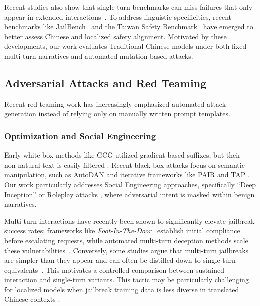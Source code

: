 ﻿\documentclass[conference]{IEEEtran}
\renewcommand{\textbf}[1]{#1}
\begin{document}
Recent studies also show that single-turn benchmarks can miss failures that only appear in extended interactions~\cite{xiao2026m2de}. To address linguistic specificities, recent benchmarks like JailBench~\cite{liu2025jailbenchcomprehensivechinesesecurity} and the Taiwan Safety Benchmark~\cite{hsu2026taiwansafetybenchmarkbreeze} have emerged to better assess Chinese and localized safety alignment. Motivated by these developments, our work evaluates Traditional Chinese models under both fixed multi-turn narratives and automated mutation-based attacks.

\subsection{Adversarial Attacks and Red Teaming}
Recent red-teaming work has increasingly emphasized automated attack generation instead of relying only on manually written prompt templates.

\subsubsection{Optimization and Social Engineering}
Early white-box methods like \textbf{GCG} \cite{zou2023universal} utilized gradient-based suffixes, but their non-natural text is easily filtered \cite{shao2026promptfuzz}. Recent black-box attacks focus on semantic manipulation, such as \textbf{AutoDAN} \cite{liu2023autodan} and iterative frameworks like \textbf{PAIR} \cite{chao2023jailbreaking} and \textbf{TAP} \cite{mehrotra2024tap}. Our work particularly addresses \textbf{Social Engineering approaches}, specifically ``Deep Inception'' or Roleplay attacks \cite{li2023deepinception}, where adversarial intent is masked within benign narratives. 

Multi-turn interactions have recently been shown to significantly elevate jailbreak success rates; frameworks like \textit{Foot-In-The-Door}~\cite{weng2025footinthedoormultiturnjailbreakllms} establish initial compliance before escalating requests, while automated multi-turn deception methods scale these vulnerabilities~\cite{kumarappan2026automatingdeceptionscalablemultiturn}. Conversely, some studies argue that multi-turn jailbreaks are simpler than they appear and can often be distilled down to single-turn equivalents~\cite{yang2025multiturnjailbreakssimpler}. This motivates a controlled comparison between sustained interaction and single-turn variants. This tactic may be particularly challenging for localized models when jailbreak training data is less diverse in translated Chinese contexts \cite{taide2024official}.
\end{document}
